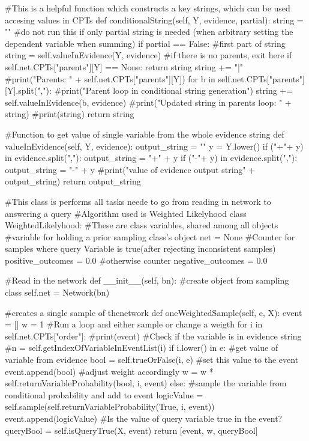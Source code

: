 \documentclass[10pt]{article}
\begin{document}
\begin{spverbatim}
    #This is a helpful function which constructs a key strings, which can be used accesing values in CPTs
    def conditionalString(self, Y, evidence,  partial):
        string = ""
        #do not run this if only partial string is needed (when arbitrary setting the dependent variable when summing)
        if partial == False:
            #first part of string
            string = self.valueInEvidence(Y, evidence)
        #if there is no parents, exit here
        if self.net.CPTs["parents"][Y] == None:
            return string
        string += "|"
        #print("Parents: " + self.net.CPTs["parents"][Y])
        for b in self.net.CPTs["parents"][Y].split(","):
            #print("Parent loop in conditional string generation")
            string += self.valueInEvidence(b,  evidence)
            #print("Updated string in parents loop: " + string)
        #print(string)
        return string
        
    #Function to get value of single variable from the whole evidence string
    def valueInEvidence(self, Y, evidence):
        output_string = ""
        y = Y.lower()
        if ("+"+ y) in evidence.split(","):
            output_string = "+" + y
        if ("-"+ y) in evidence.split(","):
            output_string = "-" + y
        #print("value of evidence output string" + output_string)
        return output_string


#This class is performs all tasks neede to go from reading in network to answering a query
#Algorithm used is Weighted Likelyhood
class WeightedLikelyhood:
    #These are class variables, shared among all objects
    #variable for holding a prior sampling class's object
    net = None
    #Counter for samples where query Variable is true(after rejecting inconsistent samples)
    positive_outcomes = 0.0
    #otherwise counter
    negative_outcomes = 0.0
    
    #Read in the network
    def __init__(self, bn):
        #create object from sampling class
        self.net = Network(bn)
    
    #creates a single sample of thenetwork
    def oneWeightedSample(self,  e,  X):
        event = []
        w = 1
        #Run a loop and either sample or change a weigth
        for i in self.net.CPTs["order"]:
            #print(event)
            #Check if the variable is in evidence string
            #n = self.getIndexOfVariableInEventList(i)
            if i.lower() in e:
                #get value of variable from evidence
                bool = self.trueOrFalse(i,  e)
                #set this value to the event
                event.append(bool)
                #adjust weight accordingly
                w = w * self.returnVariableProbability(bool,  i,  event)
            else:
                #sample the variable from conditional probability and add to event
                logicValue = self.sample(self.returnVariableProbability(True, i,  event))
                event.append(logicValue)
        #Is the value of query variable true in the event?
        queryBool = self.isQueryTrue(X,  event)
        return [event,  w, queryBool]
    

\end{spverbatim}
\end{document}

